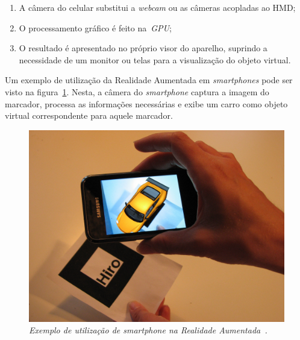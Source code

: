 	\begin{enumerate}
	  	\item A câmera do celular substitui a \textit{webcam} ou as câmeras acopladas ao HMD;
		\item O processamento gráfico é feito na~\textit{GPU};
		\item O resultado é apresentado no próprio visor do aparelho, suprindo a necessidade de um
		monitor ou telas para a visualização do objeto virtual.
	\end{enumerate}

	Um exemplo de utilização da Realidade Aumentada em \textit{smartphones} pode ser visto na
	figura~\ref{fig:arAndroid}. Nesta, a câmera do \textit{smartphone} captura a imagem do marcador,
	processa as informações necessárias e exibe um carro como objeto virtual correspondente para aquele
	marcador.
						
	\begin{figure}[htb]
		\centering \includegraphics[scale=0.1]{figuras/cap2/ARToolKit-car-Android.jpg}
		\caption{\textit{Exemplo de utilização de smartphone na Realidade Aumentada~\cite{arToolWorks}.}}
		\label{fig:arAndroid}
	\end{figure}